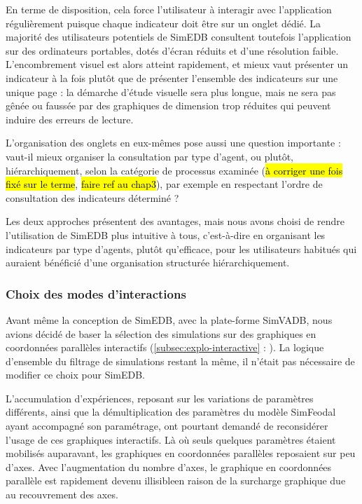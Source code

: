 En terme de disposition, cela force l'utilisateur à interagir avec l'application régulièrement puisque chaque indicateur doit être sur un onglet dédié.
La majorité des utilisateurs potentiels de SimEDB consultent toutefois l'application sur des ordinateurs portables, dotés d'écran réduits et d'une résolution faible.
L'encombrement visuel est alors atteint rapidement, et mieux vaut présenter un indicateur à la fois plutôt que de présenter l'ensemble des indicateurs sur une unique page : la démarche d'étude visuelle sera plus longue, mais ne sera pas gênée ou faussée par des graphiques de dimension trop réduites qui peuvent induire des erreurs de lecture.


L'organisation des onglets en eux-mêmes pose aussi une question importante : vaut-il mieux organiser la consultation par type d'agent, ou plutôt, hiérarchiquement, selon la catégorie de processus examinée (\hl{à corriger une fois fixé sur le terme}, \hl{faire ref au chap3}), par exemple en respectant l'ordre de consultation des indicateurs déterminé ?

Les deux approches présentent des avantages, mais nous avons choisi de rendre l'utilisation de SimEDB plus intuitive à tous, c'est-à-dire en organisant les indicateurs par type d'agents, plutôt qu'efficace, pour les utilisateurs habitués qui auraient bénéficié d'une organisation structurée hiérarchiquement.

\subsubsection{Choix des modes d'interactions}

Avant même la conception de SimEDB, avec la plate-forme SimVADB, nous avions décidé de baser la sélection des simulations sur des graphiques en coordonnées parallèles interactifs (\cref{subsec:explo-interactive} : \og {}\fg{}).
La logique d'ensemble du filtrage de simulations restant la même, il n'était pas nécessaire de modifier ce choix pour SimEDB.

L'accumulation d'expériences, reposant sur les variations de paramètres différents, ainsi que la démultiplication des paramètres du modèle SimFeodal ayant accompagné son paramétrage, ont pourtant demandé de reconsidérer l'usage de ces graphiques interactifs.
Là où seuls quelques paramètres étaient mobilisés auparavant, les graphiques en coordonnées parallèles reposaient sur peu d'axes.
Avec l'augmentation du nombre d'axes, le graphique en coordonnées parallèle est rapidement devenu illisibleen raison de la surcharge graphique due au recouvrement des axes.

